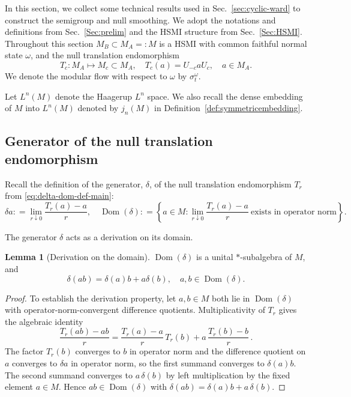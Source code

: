 \documentclass[11pt,a4paper]{article}
\theoremstyle{plain}
\numberwithin{theorem}{section}
\theoremstyle{definition}
\newtheorem{lemma}[theorem]{Lemma}
\newcommand{\?}{\overset{?}{=}}
\newcommand{\defeq}{\mathrel{\mathop:}=}
\newcommand{\lbr}{\left \{}
\newcommand{\rbr}{\right \}}
\renewcommand{\d}{\delta}	%
\DeclareMathOperator{\Dom}{Dom}
\begin{document}
\begin{appendix}
In this section, we collect some technical results used in Sec.~\ref{sec:cyclic-ward} to construct the semigroup and null smoothing. We adopt the notations and definitions from Sec.~\ref{Sec:prelim} and the HSMI structure from Sec.~\ref{Sec:HSMI}. Throughout this section $M_B\subset M_A=:M$ is a HSMI with common faithful normal state $\omega$, and the null translation endomorphism \[T_c: M_A\longmapsto M_c\subset M_A, \quad T_c(a)=U_{-c}aU_c, \quad a\in M_A.\] We denote the modular flow with respect to $\omega$ by $\sigma^\omega_t$. 

Let $L^n(M)$ denote the Haagerup $L^n$ space. We also recall the dense embedding of $M$ into $L^n(M)$ denoted by $j_n(M)$ in Definition~\ref{def:symmetricembedding}.

\subsection{Generator of the null translation endomorphism}
 
Recall the definition of the generator, $\delta$, of the null translation endomorphism $T_r$ from \eqref{eq:delta-dom-def-main}:
\begin{equation}\label{eq:delta-dom-def}
    \d a\defeq \lim_{r\downarrow0}\frac{T_r(a)-a}{r}, \quad \Dom(\d)\defeq\lbr a\in M:\lim_{r\downarrow0}\frac{T_r(a)-a}{r} \ \text{exists in operator norm} \rbr.
\end{equation}

The generator $\delta$ acts as a derivation on its domain.
\begin{lemma}[Derivation on the domain]\label{lem:derivation-on-dom}
$\Dom(\delta)$ is a unital $*$-subalgebra of $M$, and
    \begin{equation}\label{eq:delta-derivation-domain}
        \delta(ab)= \delta(a)b+a\delta(b),\quad a,b\in \Dom(\delta).
    \end{equation}
\end{lemma}
\begin{proof}
    To establish the derivation property, let $a,b\in M$ both lie in $\Dom(\delta)$ with operator-norm-convergent difference quotients.  Multiplicativity of $T_r$ gives the algebraic identity
\begin{equation*}
  \frac{T_r(ab)-ab}{r}
  =\frac{T_r(a)-a}{r}\,T_r(b)+a\,\frac{T_r(b)-b}{r}\,.
\end{equation*}
The factor $T_r(b)$ converges to $b$ in operator norm and the difference quotient on $a$ converges to $\delta a$ in operator norm, so the first summand converges to $\delta(a)b$.  The second summand converges to $a\,\delta(b)$ by left multiplication by the fixed element $a\in M$.  Hence $ab\in\Dom(\delta)$ with $\delta(ab)=\delta(a)b+a\,\delta(b)$.


\end{proof}
\end{appendix}
\end{document}
